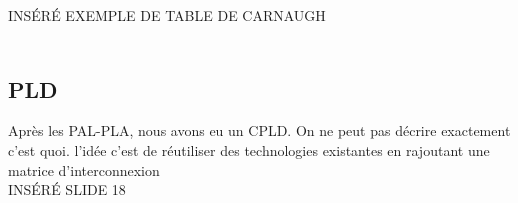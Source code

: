 \documentclass[oneside]{book}
\begin{document}
        INSÉRÉ EXEMPLE DE TABLE DE CARNAUGH\\
        \\
        \subsection{PLD}
        Après les PAL-PLA, nous avons eu un CPLD. On ne peut pas décrire exactement c'est quoi. l'idée c'est de réutiliser des technologies existantes en rajoutant une matrice d'interconnexion\\
        
        INSÉRÉ SLIDE 18\\
        
        
        
\end{document}
